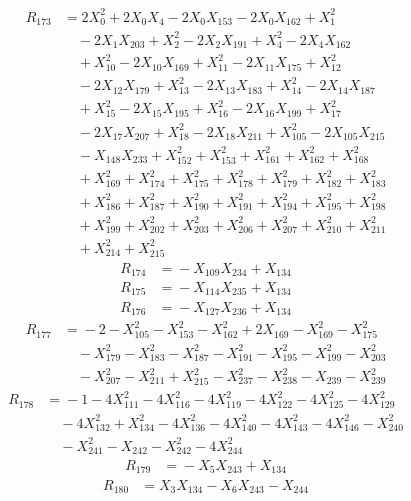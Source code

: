 \[\begin{aligned}
R_{173} &={}2X_{0}^{2} + 2X_{0}X_{4} - 2X_{0}X_{153} - 2X_{0}X_{162} + X_{1}^{2}\\
&\quad{} - 2X_{1}X_{203} + X_{2}^{2} - 2X_{2}X_{191} + X_{4}^{2} - 2X_{4}X_{162}\\
&\quad{} + X_{10}^{2} - 2X_{10}X_{169} + X_{11}^{2} - 2X_{11}X_{175} + X_{12}^{2}\\
&\quad{} - 2X_{12}X_{179} + X_{13}^{2} - 2X_{13}X_{183} + X_{14}^{2} - 2X_{14}X_{187}\\
&\quad{} + X_{15}^{2} - 2X_{15}X_{195} + X_{16}^{2} - 2X_{16}X_{199} + X_{17}^{2}\\
&\quad{} - 2X_{17}X_{207} + X_{18}^{2} - 2X_{18}X_{211} + X_{105}^{2} - 2X_{105}X_{215}\\
&\quad{} - X_{148}X_{233} + X_{152}^{2} + X_{153}^{2} + X_{161}^{2} + X_{162}^{2} + X_{168}^{2}\\
&\quad{} + X_{169}^{2} + X_{174}^{2} + X_{175}^{2} + X_{178}^{2} + X_{179}^{2} + X_{182}^{2} + X_{183}^{2}\\
&\quad{} + X_{186}^{2} + X_{187}^{2} + X_{190}^{2} + X_{191}^{2} + X_{194}^{2} + X_{195}^{2} + X_{198}^{2}\\
&\quad{} + X_{199}^{2} + X_{202}^{2} + X_{203}^{2} + X_{206}^{2} + X_{207}^{2} + X_{210}^{2} + X_{211}^{2}\\
&\quad{} + X_{214}^{2} + X_{215}^{2}
\end{aligned}\]
\[\begin{aligned}
R_{174} &={}-X_{109}X_{234} + X_{134}
\end{aligned}\]
\[\begin{aligned}
R_{175} &={}-X_{114}X_{235} + X_{134}
\end{aligned}\]
\[\begin{aligned}
R_{176} &={}-X_{127}X_{236} + X_{134}
\end{aligned}\]
\[\begin{aligned}
R_{177} &={}-2 - X_{105}^{2} - X_{153}^{2} - X_{162}^{2} + 2X_{169} - X_{169}^{2} - X_{175}^{2}\\
&\quad{} - X_{179}^{2} - X_{183}^{2} - X_{187}^{2} - X_{191}^{2} - X_{195}^{2} - X_{199}^{2} - X_{203}^{2}\\
&\quad{} - X_{207}^{2} - X_{211}^{2} + X_{215}^{2} - X_{237}^{2} - X_{238}^{2} - X_{239} - X_{239}^{2}
\end{aligned}\]
\[\begin{aligned}
R_{178} &={}-1 - 4X_{111}^{2} - 4X_{116}^{2} - 4X_{119}^{2} - 4X_{122}^{2} - 4X_{125}^{2} - 4X_{129}^{2}\\
&\quad{} - 4X_{132}^{2} + X_{134}^{2} - 4X_{136}^{2} - 4X_{140}^{2} - 4X_{143}^{2} - 4X_{146}^{2} - X_{240}^{2}\\
&\quad{} - X_{241}^{2} - X_{242} - X_{242}^{2} - 4X_{244}^{2}
\end{aligned}\]
\[\begin{aligned}
R_{179} &={}-X_{5}X_{243} + X_{134}
\end{aligned}\]
\[\begin{aligned}
R_{180} &={}X_{3}X_{134} - X_{6}X_{243} - X_{244}
\end{aligned}\]
\endgroup
